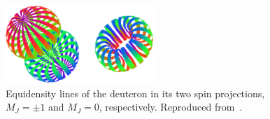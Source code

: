 
\begin{figure}
\centering
\includegraphics[width=0.5\textwidth]{figs/deuteron_states.eps}
\caption{\label{fig:dpol-shape}
Equidensity lines of the deuteron in its two spin projections, $M_J=\pm 1$ and $M_J=0$, respectively. Reproduced from~\cite{Carlson:1997qn,Forest:1996kp}.
}
\end{figure}

